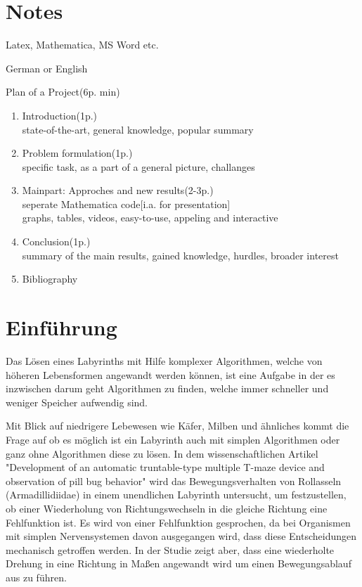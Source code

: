 \documentclass[11pt, a4paper]{article}
\begin{document}
\section{Notes}

Latex, Mathematica, MS Word etc.

\bigskip

\noindent German or English

\bigskip

\noindent Plan of a Project(6p. min)

\bigskip

\begin{enumerate}
	\item Introduction(1p.)\\
		state-of-the-art, general knowledge, popular summary
	\item Problem formulation(1p.)\\
		specific task, as a part of a general picture, challanges
	\item Mainpart: Approches and new results(2-3p.)\\
		seperate Mathematica code[i.a. for presentation]\\
		graphs, tables, videos, easy-to-use, appeling and interactive
	\item Conclusion(1p.)\\
		summary of the main results, gained knowledge, hurdles, broader interest
	\item Bibliography
\end{enumerate}

\newpage

\tableofcontents

\newpage

\section{Einführung}

Das Lösen eines Labyrinths mit Hilfe komplexer Algorithmen, welche von \\höheren Lebensformen angewandt werden können, ist eine Aufgabe in der es inzwischen darum geht Algorithmen zu finden, welche immer schneller und weniger Speicher aufwendig sind. 

\bigskip

Mit Blick auf niedrigere Lebewesen wie Käfer, Milben und ähnliches kommt die Frage auf ob es möglich ist ein Labyrinth auch mit simplen Algorithmen oder ganz ohne Algorithmen diese zu lösen. In dem wissenschaftlichen Artikel "Development of an automatic truntable-type multiple T-maze device and observation of pill bug behavior" wird das Bewegungsverhalten von Rollasseln (Armadillidiidae) in einem unendlichen Labyrinth untersucht, um festzustellen, ob einer Wiederholung von Richtungswechseln in die gleiche Richtung eine Fehlfunktion ist. Es wird von einer Fehlfunktion gesprochen, da bei Organismen mit simplen Nervensystemen davon ausgegangen wird, dass diese Entscheidungen mechanisch getroffen werden. In der Studie zeigt aber, dass eine wiederholte Drehung in eine Richtung in Maßen angewandt wird um einen Bewegungsablauf aus zu führen.
\end{document}
